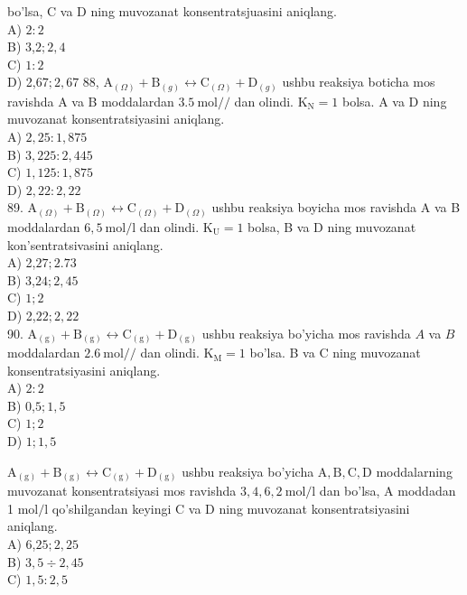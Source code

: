 bo'lsa, C va D ning muvozanat konsentratsjuasini aniqlang.\\
A) $2: 2$\\
B) 3,$2 ; 2,4$\\
C) $1: 2$\\
D) 2,$67 ; 2,67$
88, $\mathrm{A}_{(\Omega)}+\mathrm{B}_{(g)} \leftrightarrow \mathrm{C}_{(\Omega)}+\mathrm{D}_{(g)}$ ushbu reaksiya boticha mos ravishda A va B moddalardan $3.5 \mathrm{~mol} / /$ dan olindi. $\mathrm{K}_{\mathrm{N}}=1$ bolsa. A va D ning muvozanat konsentratsiyasini aniqlang.\\
A) $2,25: 1,875$\\
B) $3,225: 2,445$\\
C) $1,125: 1,875$\\
D) $2,22: 2,22$\\
89. $\mathrm{A}_{(\Omega)}+\mathrm{B}_{(\Omega)} \leftrightarrow \mathrm{C}_{(\Omega)}+\mathrm{D}_{(\Omega)}$ ushbu reaksiya boyicha mos ravishda A va B moddalardan $6,5 \mathrm{~mol} / \mathrm{l}$ dan olindi. $\mathrm{K}_{\mathrm{U}}=1$ bolsa, B va D ning muvozanat kon'sentratsivasini aniqlang.\\
A) 2,$27 ; 2.73$\\
B) 3,$24 ; 2,45$\\
C) $1 ; 2$\\
D) 2,$22 ; 2,22$\\
90. $\mathrm{A}_{(\mathrm{g})}+\mathrm{B}_{(\mathrm{g})} \leftrightarrow \mathrm{C}_{(\mathrm{g})}+\mathrm{D}_{(\mathrm{g})}$ ushbu reaksiya bo'yicha mos ravishda $A$ va $B$ moddalardan $2.6 \mathrm{~mol} / /$ dan olindi. $\mathrm{K}_{\mathrm{M}}=1$ bo'lsa. B va C ning muvozanat konsentratsiyasini aniqlang.\\
A) $2: 2$\\
B) 0,$5 ; 1,5$\\
C) $1 ; 2$\\
D) $1 ; 1,5$
  \item $\mathrm{A}_{(\mathrm{g})}+\mathrm{B}_{(\mathrm{g})} \leftrightarrow \mathrm{C}_{(\mathrm{g})}+\mathrm{D}_{(\mathrm{g})}$ ushbu reaksiya bo'yicha $\mathrm{A}, \mathrm{B}, \mathrm{C}, \mathrm{D}$ moddalarning muvozanat konsentratsiyasi mos ravishda $3,4,6,2 \mathrm{~mol} / \mathrm{l}$ dan bo'lsa, A moddadan 1 $\mathrm{mol} / \mathrm{l}$ qo'shilgandan keyingi C va D ning muvozanat konsentratsiyasini aniqlang.\\
A) 6,$25 ; 2,25$\\
B) $3,5 \div 2,45$\\
C) $1,5: 2,5$\\
